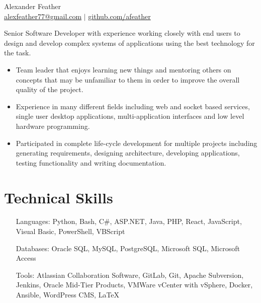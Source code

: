 \documentclass[11pt, letterpaper]{article}
\begin{document}
\pagestyle{empty}
\selectfont
\begin{center}
{\huge Alexander Feather} \\
\vspace{0.1cm}
\href{mailto:alexfeather77@gmail.com}{alexfeather77@gmail.com} \(|\) \href{https://github.com/afeather}{github.com/afeather}
\end{center}
\vspace{-0.2cm}
Senior Software Developer with experience working closely with end users to design and develop complex systems of applications using the best technology for the task.
\begin{itemize}[itemsep=0cm, parsep=0.2cm]
    \item Team leader that enjoys learning new things and mentoring others on concepts that may be unfamiliar to them in order to improve the overall quality of the project.
    \item Experience in many different fields including web and socket based services, single user desktop applications, multi-application interfaces and low level hardware programming.
    \item Participated in complete life-cycle development for multiple projects including generating requirements, designing architecture, developing applications, testing functionality and writing documentation. 
\end{itemize}
\vspace{-0.8cm}
\section*{\selectfont Technical Skills}
\vspace{-0.2cm}
\begin{itemize}[itemsep=0cm, leftmargin=0.9in, align=parleft, labelwidth=0.8in]
    \item[Languages:] Python, Bash, C\#, ASP.NET, Java, PHP, React, JavaScript, Visual Basic, PowerShell, VBScript
    \item[Databases:] Oracle SQL, MySQL, PostgreSQL, Microsoft SQL, Microsoft Access
    \item[Tools:] Atlassian Collaboration Software, GitLab, Git, Apache Subversion, Jenkins, Oracle Mid-Tier Products, VMWare vCenter with vSphere, Docker, Ansible, WordPress CMS, \LaTeX
\end{itemize}
\vspace{-1.0cm}
\end{document}
